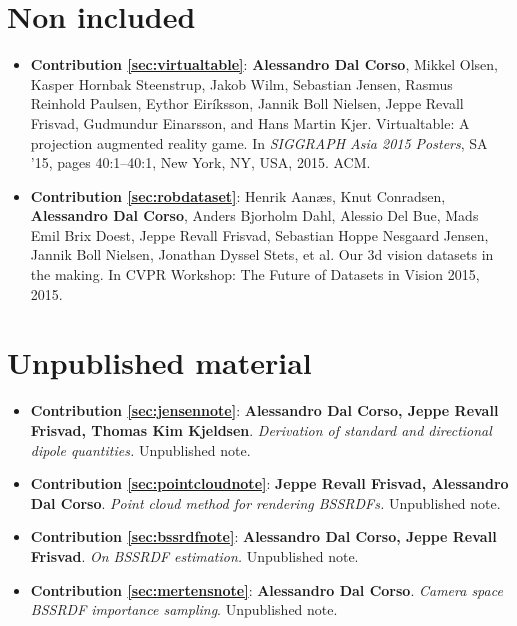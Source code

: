 \section*{Non included}
\begin{itemize}
\item  \textbf{Contribution \ref{sec:virtualtable}}: \textbf{Alessandro Dal Corso}, Mikkel Olsen, Kasper Hornbak Steenstrup, Jakob Wilm, Sebastian Jensen, Rasmus Reinhold Paulsen, Eythor Eiríksson, Jannik Boll Nielsen, Jeppe Revall Frisvad, Gudmundur Einarsson, and Hans Martin Kjer. Virtualtable: A projection augmented reality game. In \textit{SIGGRAPH Asia 2015 Posters}, SA ’15, pages 40:1–40:1, New York, NY, USA, 2015. ACM.~\cite{dalcorsosig15}
\item  \textbf{Contribution \ref{sec:robdataset}}: Henrik Aanæs, Knut Conradsen, \textbf{Alessandro Dal Corso}, Anders Bjorholm Dahl, Alessio Del Bue, Mads Emil Brix Doest, Jeppe Revall Frisvad, Sebastian Hoppe Nesgaard Jensen, Jannik Boll Nielsen, Jonathan Dyssel Stets, et al. Our 3d vision datasets in the making. In CVPR Workshop: The Future of Datasets in Vision 2015, 2015.~\cite{aanaes2015our}
\end{itemize}

\section*{Unpublished material}
\begin{itemize}
\item  \textbf{Contribution \ref{sec:jensennote}}: \textbf{Alessandro Dal Corso, Jeppe Revall Frisvad, Thomas Kim Kjeldsen}. \textit{Derivation of standard and directional dipole quantities.} Unpublished note. %
\item  \textbf{Contribution \ref{sec:pointcloudnote}}: \textbf{Jeppe Revall Frisvad, Alessandro Dal Corso}. \textit{Point cloud method for rendering BSSRDFs.} Unpublished note. %
\item  \textbf{Contribution \ref{sec:bssrdfnote}}: \textbf{Alessandro Dal Corso, Jeppe Revall Frisvad}. \textit{On BSSRDF estimation.} Unpublished note. %
\item  \textbf{Contribution \ref{sec:mertensnote}}:  \textbf{Alessandro Dal Corso}. \textit{Camera space BSSRDF importance sampling}. Unpublished note. %
\end{itemize}





